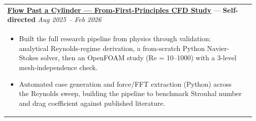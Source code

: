 \documentclass[a4paper,8pt]{article}
\newcommand{\ulhref}[2]{%
  {\hypersetup{urlcolor=.}\textcolor{.}{\href{#1}{\uline{#2}}}}%
}
\begin{document}
\begin{tabularx}{\linewidth}{ @{}l r@{} }
\textbf{\ulhref{https://github.com/Sanjanakamboj/CFD/tree/main/Flow\%20past\%20cylinder}{Flow Past a Cylinder — From-First-Principles CFD Study}} — \color[HTML]{371e77}\textbf{Self-directed} \hfill \textit{Aug 2025 -- Feb 2026}\\[1pt]
\begin{minipage}[t]{\linewidth}
    \begin{itemize}[nosep,after=\strut, leftmargin=*, itemsep=1pt]
        \item Built the full research pipeline from physics through validation: analytical Reynolds-regime derivation, a from-scratch Python Navier-Stokes solver, then an OpenFOAM study (Re = 10--1000) with a 3-level mesh-independence check.
        \item Automated case generation and force/FFT extraction (Python) across the Reynolds sweep, building the pipeline to benchmark Strouhal number and drag coefficient against published literature.
    \end{itemize}
\end{minipage}
\end{tabularx}


\end{document}
